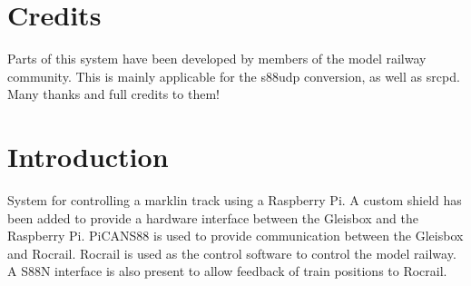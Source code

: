\section*{Credits}
Parts of this system have been developed by members of the model railway community. This is mainly applicable for the s88udp conversion, as well as srcpd. Many thanks and full credits to them!

\newpage

\section{Introduction}
System for controlling a marklin track using a Raspberry Pi. A custom shield has been added to provide a hardware interface between the Gleisbox and the Raspberry Pi. PiCANS88 is used to provide communication between the Gleisbox and Rocrail. Rocrail is used as the control software to control the model railway. A S88N interface is also present to allow feedback of train positions to Rocrail.